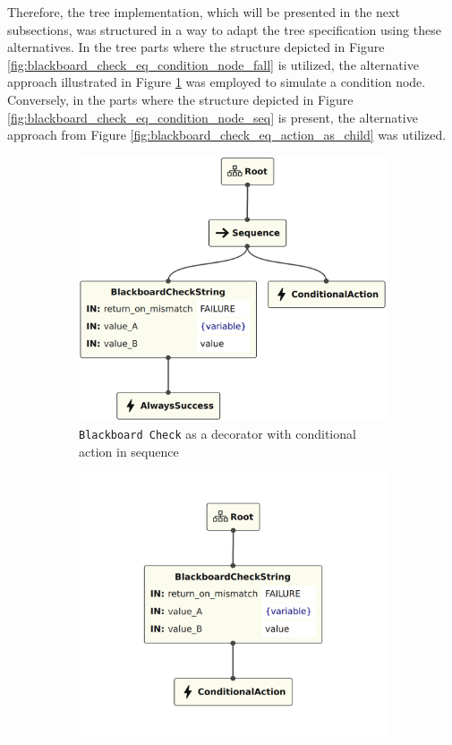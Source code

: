 Therefore, the tree implementation, which will be presented in the next subsections, was structured in a way to adapt the tree specification using these alternatives. In the tree parts where the structure depicted in Figure \ref{fig:blackboard_check_eq_condition_node_fall} is utilized, the alternative approach illustrated in Figure \ref{fig:blackboard_check_eq_action_in_sequence} was employed to simulate a condition node. Conversely, in the parts where the structure depicted in Figure \ref{fig:blackboard_check_eq_condition_node_seq} is present, the alternative approach from Figure \ref{fig:blackboard_check_eq_action_as_child} was utilized.

\begin{figure}[!h]
    \centering
    \begin{subfigure}[b]{.49\linewidth}
        \centering
        \includegraphics[width=0.85\linewidth]{chapters/development/images/BlackboardCheck - Equivalence 1.png}
        \caption{\texttt{Blackboard Check} as a decorator with conditional action in sequence}
        \label{fig:blackboard_check_eq_action_in_sequence}
    \end{subfigure}
    \hfill
    \begin{subfigure}[b]{.49\linewidth}
        \centering
        \includegraphics[width=0.85\linewidth]{chapters/development/images/BlackboardCheck - Equivalence 2.png}

\end{subfigure}
\end{figure}
